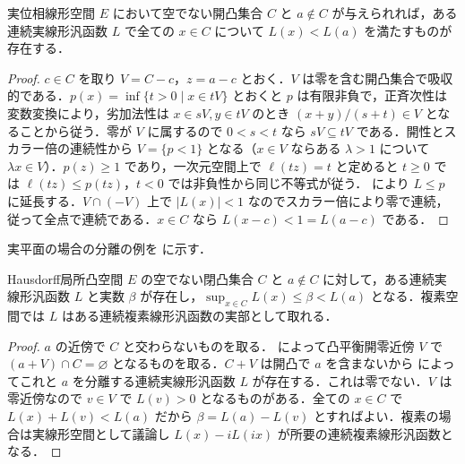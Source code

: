 \begin{prop}[開凸集合と外部の一点の分離]
実位相線形空間 $E$ において空でない開凸集合 $C$ と $a\notin C$ が与えられれば，ある連続実線形汎函数 $L$ で全ての $x\in C$ について $L(x)<L(a)$ を満たすものが存在する．
\end{prop}
\begin{proof}
$c\in C$ を取り $V=C-c$，$z=a-c$ とおく．$V$ は零を含む開凸集合で吸収的である．$p(x)=\inf\{t>0\mid x\in tV\}$ とおくと $p$ は有限非負で，正斉次性は変数変換により，劣加法性は $x\in sV,y\in tV$ のとき $(x+y)/(s+t)\in V$ となることから従う．零が $V$ に属するので $0<s<t$ なら $sV\subseteq tV$ である．開性とスカラー倍の連続性から $V=\{p<1\}$ となる（$x\in V$ ならある $\lambda>1$ について $\lambda x\in V$）．$p(z)\geq1$ であり，一次元空間上で $\ell(tz)=t$ と定めると $t\geq0$ では $\ell(tz)\leq p(tz)$，$t<0$ では非負性から同じ不等式が従う． により $L\leq p$ に延長する．$V\cap(-V)$ 上で $|L(x)|<1$ なのでスカラー倍により零で連続，従って全点で連続である．$x\in C$ なら $L(x-c)<1=L(a-c)$ である．
\end{proof}
実平面の場合の分離の例を  に示す．
\begin{prop}[局所凸空間における閉凸集合からの分離]
Hausdorff局所凸空間 $E$ の空でない閉凸集合 $C$ と $a\notin C$ に対して，ある連続実線形汎函数 $L$ と実数 $\beta$ が存在し，$\sup_{x\in C}L(x)\leq\beta<L(a)$ となる．複素空間では $L$ はある連続複素線形汎函数の実部として取れる．
\end{prop}
\begin{proof}
$a$ の近傍で $C$ と交わらないものを取る． によって凸平衡開零近傍 $V$ で $(a+V)\cap C=\varnothing$ となるものを取る．$C+V$ は開凸で $a$ を含まないから  によってこれと $a$ を分離する連続実線形汎函数 $L$ が存在する．これは零でない．$V$ は零近傍なので $v\in V$ で $L(v)>0$ となるものがある．全ての $x\in C$ で $L(x)+L(v)<L(a)$ だから $\beta=L(a)-L(v)$ とすればよい．複素の場合は実線形空間として議論し $L(x)-iL(ix)$ が所要の連続複素線形汎函数となる．
\end{proof}
